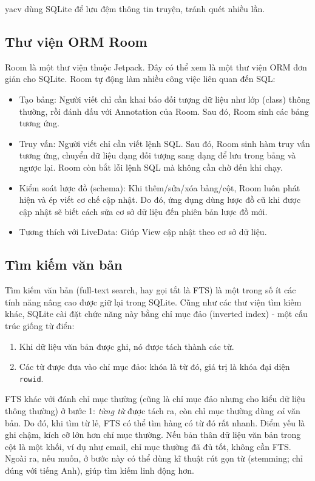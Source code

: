 \documentclass[../../thesis]{subfiles}
\begin{document}
yacv dùng SQLite để lưu đệm thông tin truyện, tránh quét nhiều lần.

\subsection{Thư viện ORM Room}\label{sec:room}

Room là một thư viện thuộc Jetpack. Đây có thể xem là một thư viện ORM đơn giản
cho SQLite. Room tự động làm nhiều công việc liên quan đến SQL:

\begin{itemize}
    \item
        Tạo bảng: Người viết chỉ cần khai báo đối tượng dữ liệu như lớp (class)
        thông thường, rồi đánh dấu với Annotation của Room. Sau đó, Room sinh
        các bảng tương ứng.
    \item
        Truy vấn: Người viết chỉ cần viết lệnh SQL. Sau đó, Room sinh hàm truy
        vấn tương ứng, chuyển dữ liệu dạng đối tượng sang dạng để lưu trong bảng
        và ngược lại. Room còn bắt lỗi lệnh SQL mà không cần chờ đến khi chạy.
    \item
        Kiểm soát lược đồ (schema): Khi thêm/sửa/xóa bảng/cột, Room luôn phát
        hiện và ép viết cơ chế cập nhật. Do đó, ứng dụng dùng lược đồ cũ khi
        được cập nhật sẽ biết cách sửa cơ sở dữ liệu đến phiên bản lược đồ mới.
    \item
        Tương thích với LiveData: Giúp View cập nhật theo cơ sở dữ liệu.
\end{itemize}

\subsection{Tìm kiếm văn bản}\label{sec:fts}

Tìm kiếm văn bản (full-text search, hay gọi tắt là FTS) là một trong số ít các
tính năng nâng cao được giữ lại trong SQLite. Cũng như các thư viện tìm kiếm
khác, SQLite cài đặt chức năng này bằng chỉ mục đảo (inverted index) - một cấu
trúc giống từ điển:

\begin{enumerate}
    \item
        Khi dữ liệu văn bản được ghi, nó được tách thành các từ.
    \item
        Các từ được đưa vào chỉ mục đảo: khóa là từ đó, giá trị là khóa đại diện
        \texttt{rowid}.
\end{enumerate}

FTS khác với đánh chỉ mục thường (cũng là chỉ mục đảo nhưng cho kiểu dữ liệu
thông thường) ở bước 1: \emph{từng từ} được tách ra, còn chỉ mục thường dùng
\emph{cả} văn bản. Do đó, khi tìm từ lẻ, FTS có thể tìm hàng có từ đó rất nhanh.
Điểm yếu là ghi chậm, kích cỡ lớn hơn chỉ mục thường. Nếu bản thân dữ liệu văn
bản trong cột là một khối, ví dụ như email, chỉ mục thường đã đủ tốt, không cần
FTS. Ngoài ra, nếu muốn, ở bước này có thể dùng kĩ thuật rút gọn từ (stemming;
chỉ đúng với tiếng Anh), giúp tìm kiếm linh động hơn.
\end{document}
